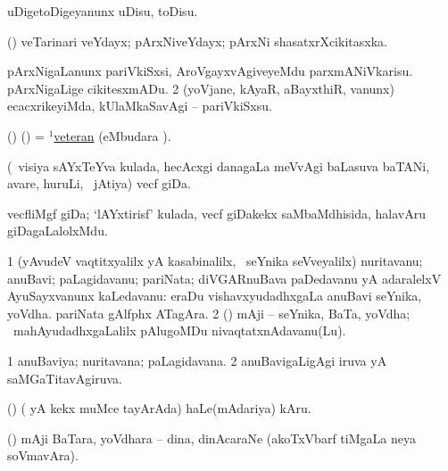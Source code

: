 \bentry
{} 
\gl{\sakirx}
\expl{}
\bmng
 uDigetoDigeyanunx uDisu, toDisu. 
\emng
\eentry

\bentry
{} 
\gl{\nA}
\expl{}
\bmng
 (\AmA) veTarinari veYdayx; pArxNiveYdayx; pArxNi shasatxrXcikitasxka. 
\emng
\eentry

\bentry
{} 
\gl{\sakirx}
\bmng
\bnum
{} 
\banum
{} pArxNigaLanunx pariVkiSxsi, AroVgayxvAgiveyeMdu parxmANiVkarisu. 
 pArxNigaLige cikitesxmADu. 
\eanum
\numie
\num{2} (yoVjane, kAyaR, aBayxthiR, \mo vanunx) ecacxrikeyiMda, kUlaMkaSavAgi -- pariVkiSxsu. 
\enum
\emng
\eentry

\bentry
{} 
\gl{\nA}
\expl{}
\bmng
 (\ame) (\AmA) = \hyperlink{veteran(1)}{$^1$veteran} (eMbudara \saMkiSx). 
\emng
\eentry

\bentry
{} 
\gl{\nA}
\expl{}
\bmng
 (\kanmu\ visiya sAYxTeYva kulada, hecAcxgi danagaLa meVvAgi baLasuva baTANi, avare, huruLi, \mo\ jAtiya) vecf giDa. 
\emng
\eentry

\bentry
{} 
\gl{\nA}
\expl{}
\bmng
 vecfliMgf giDa; `lAYxtirisf' kulada, vecf giDakekx saMbaMdhisida, halavAru giDagaLalolxMdu. 
\emng
\eentry

\bentry
{} 
\gl{\nA}
\expl{}
\bmng
\bnum
\num{1} (yAvudeV vaqtitxyalilx yA kasabinalilx, \kanmu\ seYnika seVveyalilx) nuritavanu; anuBavi; paLagidavanu; pariNata; diVGARnuBava paDedavanu yA adaralelxV AyuSayxvanunx kaLedavanu:  eraDu vishavxyudadhxgaLa anuBavi seYnika, yoVdha.  pariNata gAlfphx ATagAra. 
\num{2} (\ame) mAji -- seYnika, BaTa, yoVdha; \kanmu\ mahAyudadhxgaLalilx pAlugoMDu nivaqtatxnAdavanu(Lu). 
\enum
\emng
\eentry

\bentry
{} 
\gl{\gu}
\expl{}
\bmng
\bnum
\num{1} anuBaviya; nuritavana; paLagidavana. 
\num{2} anuBavigaLigAgi iruva yA saMGaTitavAgiruva. 
\enum
\emng
\eentry

\bentry
{}
\gl{\nA}
\expl{}
\bmng
 (\birx) ( yA kekx muMce tayArAda) haLe(mAdariya) kAru. 
\emng
\eentry

\bentry
{}
\gl{\nA}
\expl{}
\bmng
 (\ame) mAji BaTara, yoVdhara -- dina, dinAcaraNe (akoTxVbarf tiMgaLa neya soVmavAra). 
\emng
\eentry

